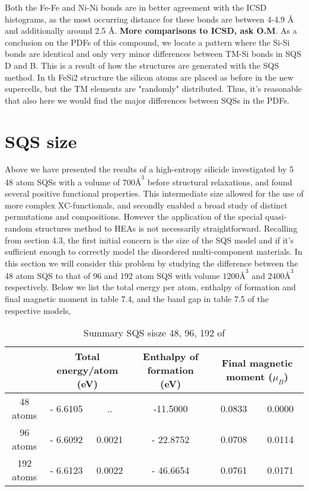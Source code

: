 Both the Fe-Fe and Ni-Ni bonds are in better agreement with the ICSD histograms, as the most occurring distance for these bonds are between 4-4.9 Å and additionally around 2.5 Å. \textbf{More comparisons to ICSD, ask O.M}. As a conclusion on the PDFs of this compound, we locate a pattern where the Si-Si bonds are identical and only very minor differences between TM-Si bonds in SQS D and B. This is a result of how the structures are generated with the SQS method. In th FeSi2 structure the silicon atoms are placed as before in the new supercells, but the TM elements are "randomly" distributed. Thus, it's reasonable that also here we would find the major differences between SQSs in the PDFs. 

\newpage
\section{SQS size}
Above we have presented the results of a high-entropy silicide  investigated by 5 48 atom SQSs with a volume of $700 Å^3$ before structural relaxations, and found several positive functional properties. This intermediate size allowed for the use of more complex XC-functionals, and secondly enabled a broad study of distinct permutations and compositions. However the application of the special quasi-random structures method to HEAs is not necessarily straightforward. Recalling from section 4.3, the first initial concern is the size of the SQS model and if it's sufficient enough to correctly model the disordered multi-component materials. In this section we will consider this problem by studying the difference between the 48 atom SQS to that of 96 and 192 atom SQS with volume $1200 Å^3$ and $2400 Å^3$ respectively. Below we list the total energy per atom, enthalpy of formation and final magnetic moment in table 7.4, and the band gap in table 7.5 of the respective models, 

\begin{table}[H]
\begin{tabular}{@{}cccccc@{}}
\toprule
       & \multicolumn{2}{c}{Total energy/atom (eV)} & Enthalpy of formation (eV) & \multicolumn{2}{c}{Final magnetic moment ($\mu_B$)} \\ \midrule
48 atoms & - 6.6105 & .. & -11.5000 & 0.0833 & 0.0000    \\
96 atoms & - 6.6092  & 0.0021 & - 22.8752  & 0.0708  & 0.0114     \\
192 atoms & - 6.6123  & 0.0022 & - 46.6654 & 0.0761 & 0.0171     \\ \bottomrule
\end{tabular}
\caption{Summary SQS sisze 48, 96, 192 of }
\end{table}

